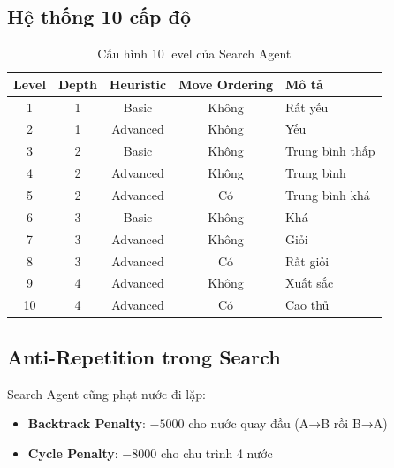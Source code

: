 \subsection{Hệ thống 10 cấp độ}
\begin{table}[H]
\centering
\caption{Cấu hình 10 level của Search Agent}
\begin{tabular}{ccccl}
\toprule
\textbf{Level} & \textbf{Depth} & \textbf{Heuristic} & \textbf{Move Ordering} & \textbf{Mô tả} \\
\midrule
1 & 1 & Basic & Không & Rất yếu \\
2 & 1 & Advanced & Không & Yếu \\
3 & 2 & Basic & Không & Trung bình thấp \\
4 & 2 & Advanced & Không & Trung bình \\
5 & 2 & Advanced & Có & Trung bình khá \\
6 & 3 & Basic & Không & Khá \\
7 & 3 & Advanced & Không & Giỏi \\
8 & 3 & Advanced & Có & Rất giỏi \\
9 & 4 & Advanced & Không & Xuất sắc \\
10 & 4 & Advanced & Có & Cao thủ \\
\bottomrule
\end{tabular}
\end{table}

\subsection{Anti-Repetition trong Search}
Search Agent cũng phạt nước đi lặp:
\begin{itemize}
    \item \textbf{Backtrack Penalty}: $-5000$ cho nước quay đầu (A→B rồi B→A)
    \item \textbf{Cycle Penalty}: $-8000$ cho chu trình 4 nước
\end{itemize}
